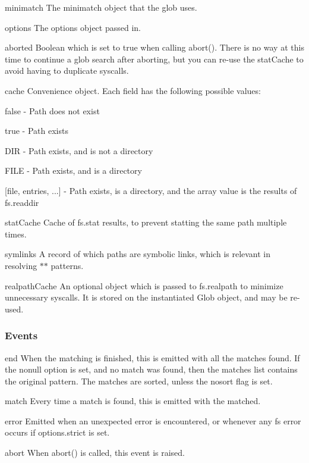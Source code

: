 \begin{DoxyItemize}
\item {\ttfamily minimatch} The minimatch object that the glob uses.
\item {\ttfamily options} The options object passed in.
\item {\ttfamily aborted} Boolean which is set to true when calling {\ttfamily abort()}. There is no way at this time to continue a glob search after aborting, but you can re-\/use the stat\+Cache to avoid having to duplicate syscalls.
\item {\ttfamily cache} Convenience object. Each field has the following possible values\+:
\begin{DoxyItemize}
\item {\ttfamily false} -\/ Path does not exist
\item {\ttfamily true} -\/ Path exists
\item {\ttfamily \textquotesingle{}D\+I\+R\textquotesingle{}} -\/ Path exists, and is not a directory
\item {\ttfamily \textquotesingle{}F\+I\+L\+E\textquotesingle{}} -\/ Path exists, and is a directory
\item {\ttfamily \mbox{[}file, entries, ...\mbox{]}} -\/ Path exists, is a directory, and the array value is the results of {\ttfamily fs.\+readdir}
\end{DoxyItemize}
\item {\ttfamily stat\+Cache} Cache of {\ttfamily fs.\+stat} results, to prevent statting the same path multiple times.
\item {\ttfamily symlinks} A record of which paths are symbolic links, which is relevant in resolving {\ttfamily $\ast$$\ast$} patterns.
\item {\ttfamily realpath\+Cache} An optional object which is passed to {\ttfamily fs.\+realpath} to minimize unnecessary syscalls. It is stored on the instantiated Glob object, and may be re-\/used.
\end{DoxyItemize}

\subsubsection*{Events}


\begin{DoxyItemize}
\item {\ttfamily end} When the matching is finished, this is emitted with all the matches found. If the {\ttfamily nonull} option is set, and no match was found, then the {\ttfamily matches} list contains the original pattern. The matches are sorted, unless the {\ttfamily nosort} flag is set.
\item {\ttfamily match} Every time a match is found, this is emitted with the matched.
\item {\ttfamily error} Emitted when an unexpected error is encountered, or whenever any fs error occurs if {\ttfamily options.\+strict} is set.
\item {\ttfamily abort} When {\ttfamily abort()} is called, this event is raised.
\end{DoxyItemize}

